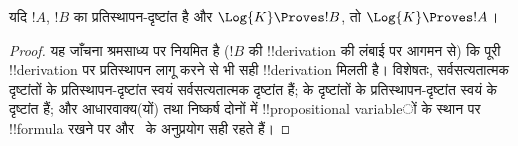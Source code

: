 \documentclass[../../../include/open-logic-section]{subfiles}
\begin{document}
\begin{prop}
  यदि $!A$, $!B$ का प्रतिस्थापन-दृष्टांत है और $\Log{K} \Proves !B$, तो
  $\Log{K} \Proves !A$।
\end{prop}

\begin{proof}
  यह जाँचना श्रमसाध्य पर नियमित है ($!B$ की !!{derivation} की लंबाई पर
  आगमन से) कि पूरी !!{derivation} पर प्रतिस्थापन लागू करने से भी सही
  !!{derivation} मिलती है। विशेषतः, सर्वसत्यतात्मक दृष्टांतों के
  प्रतिस्थापन-दृष्टांत स्वयं सर्वसत्यतात्मक दृष्टांत हैं;
   के दृष्टांतों के
  प्रतिस्थापन-दृष्टांत स्वयं  के
  दृष्टांत हैं; और आधारवाक्य(यों) तथा निष्कर्ष दोनों में !!{propositional variable}ों
  के स्थान पर !!{formula} रखने पर \MP{} और~\Nec{} के अनुप्रयोग सही रहते हैं।
\end{proof}
\end{document}
